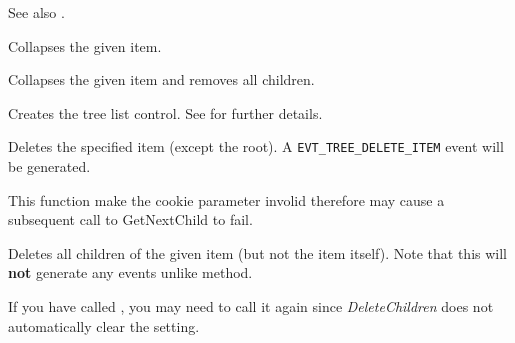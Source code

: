 See also .


\label{wxtreelistctrlcollapse}


Collapses the given item.

\label{wxtreelistctrlcollapseandreset}


Collapses the given item and removes all children.

\label{wxtreelistctrlcreate}


Creates the tree list control. See  for further details.

\label{wxtreelistctrldelete}


Deletes the specified item (except the root). A {\tt EVT\_TREE\_DELETE\_ITEM} event
will be generated.

This function make the cookie parameter involid therefore may cause a subsequent call
to GetNextChild to fail.

\label{wxtreelistctrldeletechildren}


Deletes all children of the given item (but not the item itself). Note that
this will {\bf not} generate any events unlike
 method.

If you have called , you
may need to call it again since {\it DeleteChildren} does not automatically
clear the setting.

\label{wxtreelistctrldeleteroot}

